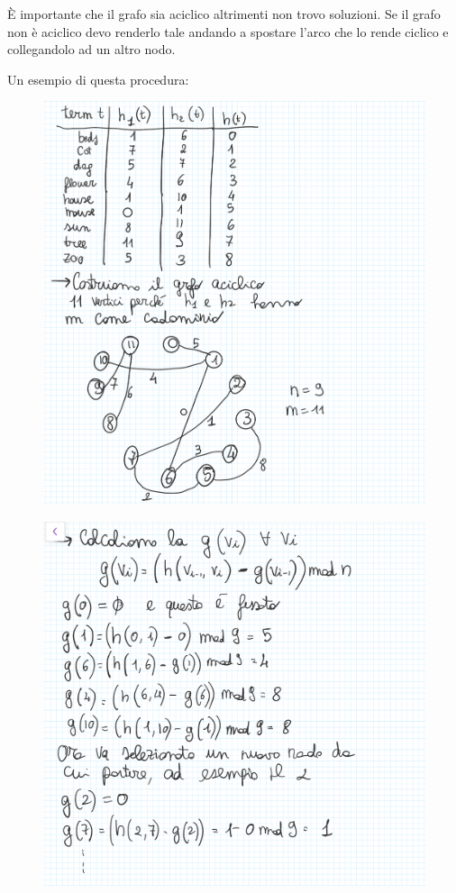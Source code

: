 \documentclass[14pt]{extreport}
\begin{document}
È importante che il grafo sia aciclico altrimenti non trovo soluzioni.
Se il grafo non è aciclico devo renderlo tale andando a spostare l'arco che lo rende ciclico e collegandolo ad un altro nodo.

Un esempio di questa procedura:

\begin{figure}[H]
\centering
  \includegraphics[width=0.8\linewidth]{IMG_0188.jpg}
\end{figure}

\begin{figure}[H]
\centering
  \includegraphics[width=0.8\linewidth]{IMG_0189.jpg}
\end{figure}
\end{document}
